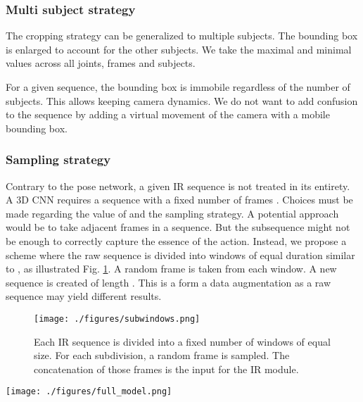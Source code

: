\documentclass[letterpaper, 10 pt, conference]{ieeeconf}
\begin{document}
\subsubsection{Multi subject strategy}

The cropping strategy can be generalized to multiple subjects. The bounding box is enlarged to account for the other subjects. We take the maximal and minimal values across all joints, frames and subjects.

For a given sequence, the bounding box is immobile regardless of the number of subjects. This allows keeping camera dynamics. We do not want to add confusion to the sequence by adding a virtual movement of the camera with a mobile bounding box. 

\subsubsection{Sampling strategy} \label{ir_sub_sample}

Contrary to the pose network, a given IR sequence is not treated in its entirety. A 3D CNN requires a sequence with a fixed number of frames . Choices must be made regarding the value of  and the sampling strategy. A potential approach would be to take adjacent frames in a sequence. But the subsequence might not be enough to correctly capture the essence of the action. Instead, we propose a scheme where the raw sequence is divided into  windows of equal duration similar to \cite{liu2016spatio}, as illustrated Fig. \ref{sub_windows}. A random frame is taken from each window. A new sequence is created of length . This is a form a data augmentation as a raw sequence may yield different results.

\begin{figure}[t]
  \centering
  \texttt{[image: ./figures/subwindows.png]}
  \caption{Each IR sequence is divided into a fixed number of windows of equal size. For each subdivision, a random frame is sampled. The concatenation of those frames is the input for the IR module.}
  \label{sub_windows}
\end{figure}

\begin{figure*}[t]
  \centering
  \texttt{[image: ./figures/full\_model.png]}
  \caption{The full detailed model. The pose and IR modules output separate feature vectors. The two are concatenated and a final MLP outputs a class probability distribution. The pose network is a pre-trained \textit{ResNet-18}. The IR network is a pre-trained \textit{R(2+1)D-18} network.}
  \label{full_model}
\end{figure*}
\end{document}
